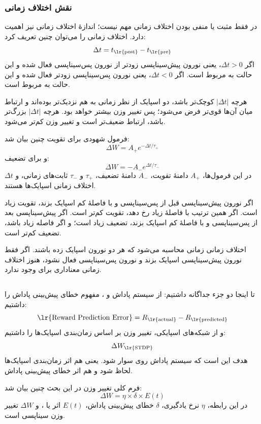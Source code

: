 \subsubsection{نقش اختلاف زمانی}
در  فقط مثبت یا منفی بودن اختلاف زمانی مهم نیست؛ اندازهٔ اختلاف زمانی نیز اهمیت دارد. اختلاف زمانی را می‌توان چنین تعریف کرد:
\[
\Delta t = t_{\text{\lr{post}}} - t_{\text{\lr{pre}}}
\]
اگر \(\Delta t > 0\)، یعنی نورون پیش‌سیناپسی زودتر از نورون پس‌سیناپسی فعال شده و این حالت به  مربوط است. اگر \(\Delta t < 0\)، یعنی نورون پس‌سیناپسی زودتر فعال شده و این حالت به  مربوط است.

هرچه \(|\Delta t|\) کوچک‌تر باشد، دو اسپایک از نظر زمانی به هم نزدیک‌تر بوده‌اند و ارتباط میان آن‌ها قوی‌تر فرض می‌شود؛ پس تغییر وزن بیشتر خواهد بود. هرچه \(|\Delta t|\) بزرگ‌تر باشد، ارتباط ضعیف‌تر است و تغییر وزن کم‌تر می‌شود.

فرمول شهودی برای تقویت چنین بیان شد:
\[
\Delta W = A_+ e^{-\Delta t / \tau_+}
\]
و برای تضعیف:
\[
\Delta W = -A_- e^{\Delta t / \tau_-}
\]
در این فرمول‌ها، \(A_+\) دامنهٔ تقویت، \(A_-\) دامنهٔ تضعیف، \(\tau_+\) و \(\tau_-\) ثابت‌های زمانی، و \(\Delta t\) اختلاف زمانی اسپایک‌ها هستند.

اگر نورون پیش‌سیناپسی قبل از پس‌سیناپسی و با فاصلهٔ کم اسپایک بزند، تقویت زیاد است. اگر همین ترتیب با فاصلهٔ زیاد رخ دهد، تقویت کم‌تر است. اگر پیش‌سیناپسی بعد از پس‌سیناپسی و با فاصلهٔ کم اسپایک بزند، تضعیف زیاد است؛ و اگر فاصله زیاد باشد، تضعیف کم‌تر است.

اختلاف زمانی زمانی محاسبه می‌شود که هر دو نورون اسپایک زده باشند. اگر فقط نورون پیش‌سیناپسی اسپایک بزند و نورون پس‌سیناپسی فعال نشود، هنوز اختلاف زمانی معناداری برای  وجود ندارد.

\subsection{}
تا اینجا دو جزء جداگانه داشتیم: از سیستم پاداش و ، مفهوم خطای پیش‌بینی پاداش را داشتیم:
\[
\text{\lr{Reward Prediction Error}} =
R_{\text{\lr{actual}}} - R_{\text{\lr{predicted}}}
\]
و از شبکه‌های اسپایکی، تغییر وزن بر اساس زمان‌بندی اسپایک‌ها را داشتیم:
\[
\Delta W_{\text{\lr{STDP}}}
\]
هدف  این است که سیستم پاداش روی  سوار شود. یعنی هم اثر زمان‌بندی اسپایک‌ها لحاظ شود و هم اثر خطای پیش‌بینی پاداش.

فرم کلی تغییر وزن در این بحث چنین بیان شد:
\[
\Delta W = \eta \times \delta \times E(t)
\]
در این رابطه، \(\eta\) نرخ یادگیری، \(\delta\) خطای پیش‌بینی پاداش، \(E(t)\) اثر  یا ، و \(\Delta W\) تغییر وزن سیناپسی است.


